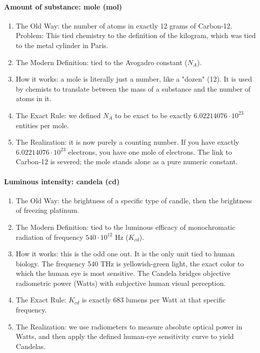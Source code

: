 \documentclass[../main.tex]{subfiles}
\begin{document}
\paragraph{Amount of substance: mole (mol)}

\begin{enumerate}
	\item[\textbf{-}] The Old Way: the number of atoms in exactly 12 grams of Carbon-12. Problem: This tied chemistry to the definition of the kilogram, which was tied to the metal cylinder in Paris.
	\item[\textbf{-}] The Modern Definition: tied to the Avogadro constant ($N_A$).
	\item[\textbf{-}] How it works: a mole is literally just a number, like a "dozen" (12). It is used by chemists to translate between the mass of a substance and the number of atoms in it.
	\item[\textbf{-}] The Exact Rule: we defined $N_A$ to be exact to be exactly $6.02214076 \cdot 10^{23}$ entities per mole.
	\item[\textbf{-}] The Realization: it is now purely a counting number. If you have exactly $6.02214076 \cdot 10^{23}$ electrons, you have one mole of electrons. The link to Carbon-12 is severed; the mole stands alone as a pure numeric constant.
\end{enumerate}

\paragraph{Luminous intensity: candela (cd)}

\begin{enumerate}
	\item[\textbf{-}] The Old Way: the brightness of a specific type of candle, then the brightness of freezing platinum.
	\item[\textbf{-}] The Modern Definition: tied to the luminous efficacy of monochromatic radiation of frequency $540 \cdot 10^{12}$ Hz ($K_{cd}$).
	\item[\textbf{-}] How it works: this is the odd one out. It is the only unit tied to human biology. The frequency 540 THz is yellowish-green light, the exact color to which the human eye is most sensitive. The Candela bridges objective radiometric power (Watts) with subjective human visual perception.
	\item[\textbf{-}] The Exact Rule: $K_{cd}$ is exactly 683 lumens per Watt at that specific frequency.
	\item[\textbf{-}] The Realization: we use radiometers to measure absolute optical power in Watts, and then apply the defined human-eye sensitivity curve to yield Candelas.
\end{enumerate}
\end{document}
